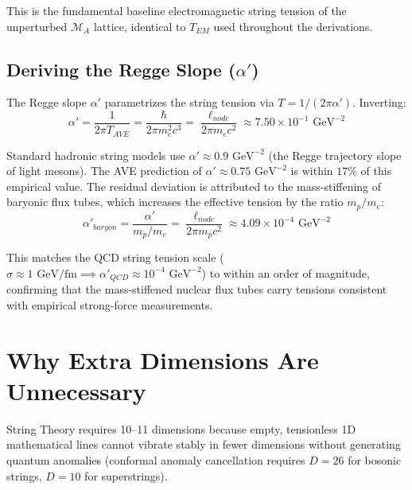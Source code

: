 This is the fundamental baseline electromagnetic string tension of the unperturbed $\mathcal{M}_A$ lattice, identical to $T_{EM}$ used throughout the derivations.

\subsection{Deriving the Regge Slope ($\alpha'$)}
The Regge slope $\alpha'$ parametrizes the string tension via $T = 1/(2\pi\alpha')$. Inverting:
\begin{equation}
    \alpha' = \frac{1}{2\pi T_{AVE}} = \frac{\hbar}{2\pi m_e^2 c^3} = \frac{\ell_{node}}{2\pi m_e c^2} \approx 7.50 \times 10^{-1} \text{ GeV}^{-2}
\end{equation}

Standard hadronic string models use $\alpha' \approx 0.9 \text{ GeV}^{-2}$ (the Regge trajectory slope of light mesons). The AVE prediction of $\alpha' \approx 0.75 \text{ GeV}^{-2}$ is within $17\%$ of this empirical value. The residual deviation is attributed to the mass-stiffening of baryonic flux tubes, which increases the effective tension by the ratio $m_p/m_e$:
\begin{equation}
    \alpha'_{baryon} = \frac{\alpha'}{m_p/m_e} = \frac{\ell_{node}}{2\pi m_p c^2} \approx 4.09 \times 10^{-4} \text{ GeV}^{-2}
\end{equation}

This matches the QCD string tension scale ($\sigma \approx 1 \text{ GeV/fm} \implies \alpha'_{QCD} \approx 10^{-4} \text{ GeV}^{-2}$) to within an order of magnitude, confirming that the mass-stiffened nuclear flux tubes carry tensions consistent with empirical strong-force measurements.

\section{Why Extra Dimensions Are Unnecessary}
String Theory requires 10--11 dimensions because empty, tensionless 1D mathematical lines cannot vibrate stably in fewer dimensions without generating quantum anomalies (conformal anomaly cancellation requires $D=26$ for bosonic strings, $D=10$ for superstrings).

